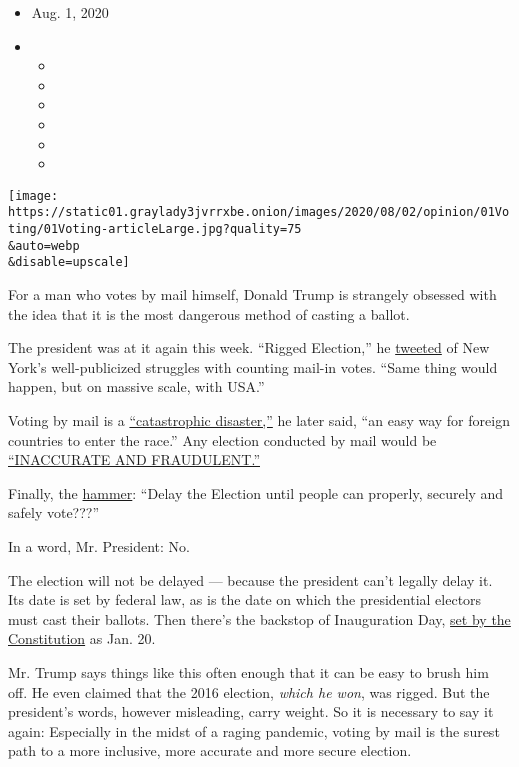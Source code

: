 \begin{itemize}
\item
  Aug. 1, 2020
\item
  \begin{itemize}
  \item
  \item
  \item
  \item
  \item
  \item
  \end{itemize}
\end{itemize}

\texttt{[image: https://static01.graylady3jvrrxbe.onion/images/2020/08/02/opinion/01Voting/01Voting-articleLarge.jpg?quality=75\\\&auto=webp\\\&disable=upscale]}

For a man who votes by mail himself, Donald Trump is strangely obsessed
with the idea that it is the most dangerous method of casting a ballot.

The president was at it again this week. ``Rigged Election,'' he
\href{https://twitter.com/realDonaldTrump/status/1288602262567153664}{tweeted}
of New York's well-publicized struggles with counting mail-in votes.
``Same thing would happen, but on massive scale, with USA.''

Voting by mail is a
\href{https://twitter.com/realDonaldTrump/status/1288809157722877952}{``catastrophic
disaster,''} he later said, ``an easy way for foreign countries to enter
the race.'' Any election conducted by mail would be
\href{https://twitter.com/realDonaldTrump/status/1288818160389558273}{``INACCURATE
AND FRAUDULENT.''}

Finally, the
\href{https://twitter.com/realDonaldTrump/status/1288818160389558273}{hammer}:
``Delay the Election until people can properly, securely and safely
vote???''

In a word, Mr. President: No.

The election will not be delayed --- because the president can't legally
delay it. Its date is set by federal law, as is the date on which the
presidential electors must cast their ballots. Then there's the backstop
of Inauguration Day,
\href{https://constitutioncenter.org/interactive-constitution/amendment/amendment-xx}{set
by the Constitution} as Jan. 20.

Mr. Trump says things like this often enough that it can be easy to
brush him off. He even claimed that the 2016 election, \emph{which he
won}, was rigged. But the president's words, however misleading, carry
weight. So it is necessary to say it again: Especially in the midst of a
raging pandemic, voting by mail is the surest path to a more inclusive,
more accurate and more secure election.

